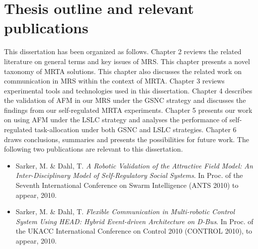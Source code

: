 \section{Thesis outline and relevant publications}
This dissertation has been organized as follows.
Chapter 2  reviews the related literature on general terms and key issues of MRS. This chapter presents a novel taxonomy of MRTA solutions. This chapter also discusses the related work on communication in MRS within the context of MRTA.
Chapter 3 reviews experimental tools and technologies used in this dissertation.
Chapter 4 describes the validation of AFM in our MRS under the GSNC strategy and discusses the findings from our self-regulated MRTA experiments.
Chapter 5 presents our work on using AFM under the LSLC strategy and analyses the  performance of self-regulated task-allocation under both GSNC and LSLC strategies.
Chapter 6 draws conclusions, summaries and presents the possibilities for future work.
The following two publications are relevant to this dissertation.
\begin{itemize}
\item Sarker, M. \& Dahl, T.\textit{ A Robotic Validation of the Attractive Field Model: An Inter-Disciplinary Model of Self-Regulatory Social Systems}. In Proc. of the Seventh International Conference on Swarm Intelligence (ANTS 2010) to appear, 2010.
\item Sarker, M. \& Dahl, T. \textit{Flexible Communication in Multi-robotic Control System Using HEAD: Hybrid Event-driven Architecture on D-Bus}. In Proc. of the UKACC International Conference on Control 2010 (CONTROL 2010), to appear, 2010.
\end{itemize}